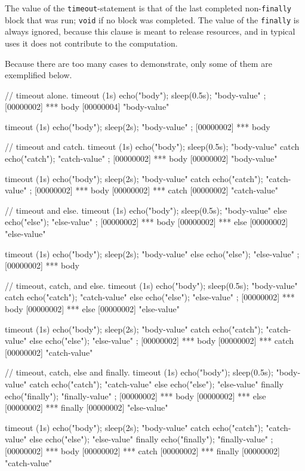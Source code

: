The value of the \lstinline{timeout}-statement is that of the last
completed non-\lstinline{finally} block that was run; \lstinline{void} if
no block was completed.  The value of the \lstinline{finally} is always
ignored, because this clause is meant to release resources, and in typical
uses it does not contribute to the computation.

Because there are too many cases to demonstrate, only some of them are
exemplified below.
\begin{urbiscript}
// timeout alone.
timeout (1s)  { echo("body"); sleep(0.5s); "body-value" };
[00000002] *** body
[00000004] "body-value"

timeout (1s)  { echo("body"); sleep(2s); "body-value" };
[00000002] *** body

// timeout and catch.
timeout (1s)  { echo("body"); sleep(0.5s); "body-value" }
catch         { echo("catch"); "catch-value" };
[00000002] *** body
[00000002] "body-value"

timeout (1s)  { echo("body"); sleep(2s); "body-value" }
catch         { echo("catch"); "catch-value" };
[00000002] *** body
[00000002] *** catch
[00000002] "catch-value"

// timeout and else.
timeout (1s)  { echo("body"); sleep(0.5s); "body-value" }
else          { echo("else"); "else-value" };
[00000002] *** body
[00000002] *** else
[00000002] "else-value"

timeout (1s)  { echo("body"); sleep(2s); "body-value" }
else          { echo("else"); "else-value" };
[00000002] *** body

// timeout, catch, and else.
timeout (1s)  { echo("body"); sleep(0.5s); "body-value" }
catch         { echo("catch"); "catch-value" }
else          { echo("else"); "else-value" };
[00000002] *** body
[00000002] *** else
[00000002] "else-value"

timeout (1s)  { echo("body"); sleep(2s); "body-value" }
catch         { echo("catch"); "catch-value" }
else          { echo("else"); "else-value" };
[00000002] *** body
[00000002] *** catch
[00000002] "catch-value"

// timeout, catch, else and finally.
timeout (1s)  { echo("body"); sleep(0.5s); "body-value" }
catch         { echo("catch"); "catch-value" }
else          { echo("else"); "else-value" }
finally       { echo("finally"); "finally-value" };
[00000002] *** body
[00000002] *** else
[00000002] *** finally
[00000002] "else-value"

timeout (1s)  { echo("body"); sleep(2s); "body-value" }
catch         { echo("catch"); "catch-value" }
else          { echo("else"); "else-value" }
finally       { echo("finally"); "finally-value" };
[00000002] *** body
[00000002] *** catch
[00000002] *** finally
[00000002] "catch-value"
\end{urbiscript}

